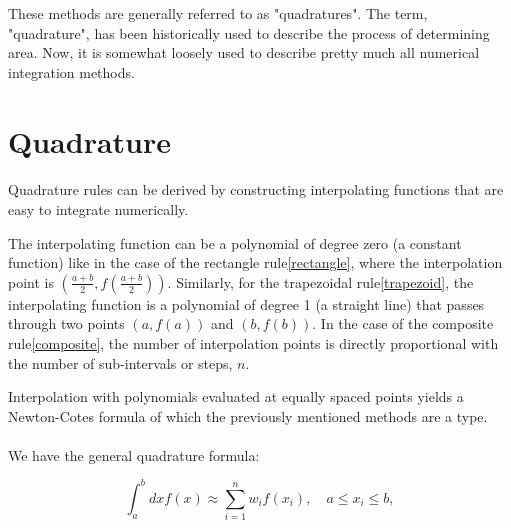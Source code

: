 \vspace{0.25in}

These methods are generally referred to as "quadratures". The term, "quadrature", has been historically used to describe the process of determining area. Now, it is somewhat loosely used to describe pretty much all numerical integration methods.

\section{Quadrature}

\paragraph{} Quadrature rules can be derived by constructing interpolating functions that are easy to integrate numerically.

The interpolating function can be a polynomial of degree zero (a constant function) like in the case of the rectangle rule\eqref{rectangle},
where the interpolation point is $\left(\frac{a+b}{2},f\left(\frac{a+b}{2}\right)\right)$. Similarly, for the trapezoidal rule\eqref{trapezoid}, the interpolating function is a polynomial of degree 1 (a straight line) that passes through two points $(a,f(a))$ and $(b,f(b))$. 
In the case of the composite rule\eqref{composite}, the number of interpolation points is directly proportional with the number of sub-intervals or steps, $n$.

Interpolation with polynomials evaluated at equally spaced points yields a Newton-Cotes formula of which the previously mentioned methods are a type.

\paragraph{} We have the general quadrature formula: 


\begin{equation}
    \int_a^b dx f(x)  \approx \sum_{i=1}^n w_if(x_i), \quad a \leq x_i \leq b,\label{quadrature}
\end{equation}
    

